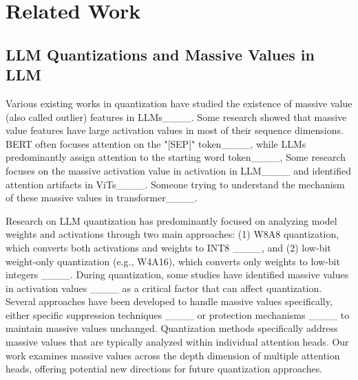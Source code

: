 \section{Related Work}
\subsection{LLM Quantizations and Massive Values in LLM}

Various existing works in quantization have studied the existence of massive value (also called outlier) features in LLMs____. Some research showed that massive value features have large activation values in most of their sequence dimensions. BERT often focuses attention on the "[SEP]" token____, while LLMs predominantly assign attention to the starting word token____, Some research focuses on the massive activation value in activation in LLM____ and identified attention artifacts in ViTs____. Someone trying to understand the mechanism of these massive values in transformer____.

Research on LLM quantization has predominantly focused on analyzing model weights and activations through two main approaches: (1) W8A8 quantization, which converts both activations and weights to INT8 ____, and (2) low-bit weight-only quantization (e.g., W4A16), which converts only weights to low-bit integers ____. 
During quantization, some studies have identified massive values in activation values ____ as a critical factor that can affect quantization. Several approaches have been developed to handle massive values specifically, either specific suppression techniques ____ or protection mechanisms ____ to maintain massive values unchanged. Quantization methods specifically address massive values that are typically analyzed within individual attention heads. Our work examines massive values across the depth dimension of multiple attention heads, offering potential new directions for future quantization approaches.

